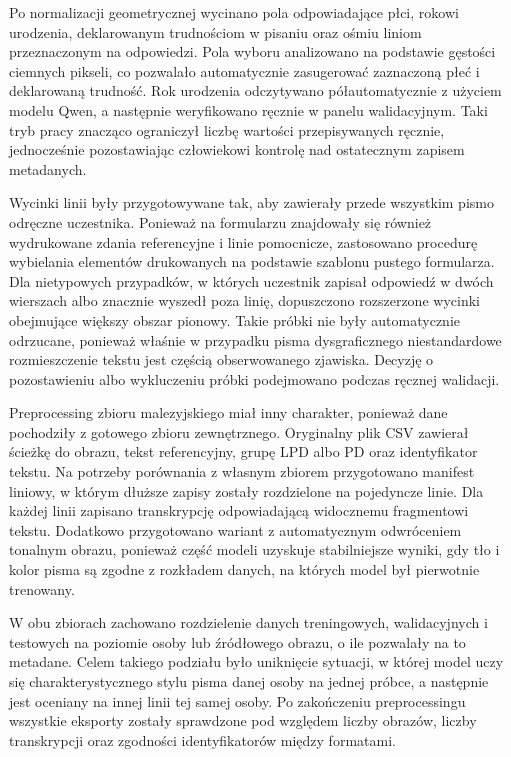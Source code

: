 Po normalizacji geometrycznej wycinano pola odpowiadające płci, rokowi urodzenia, deklarowanym
trudnościom w pisaniu oraz ośmiu liniom przeznaczonym na odpowiedzi. Pola wyboru analizowano
na podstawie gęstości ciemnych pikseli, co pozwalało automatycznie zasugerować zaznaczoną płeć
i deklarowaną trudność. Rok urodzenia odczytywano półautomatycznie z użyciem modelu Qwen,
a następnie weryfikowano ręcznie w panelu walidacyjnym. Taki tryb pracy znacząco ograniczył
liczbę wartości przepisywanych ręcznie, jednocześnie pozostawiając człowiekowi kontrolę nad
ostatecznym zapisem metadanych.

Wycinki linii były przygotowywane tak, aby zawierały przede wszystkim pismo odręczne uczestnika.
Ponieważ na formularzu znajdowały się również wydrukowane zdania referencyjne i linie pomocnicze,
zastosowano procedurę wybielania elementów drukowanych na podstawie szablonu pustego formularza.
Dla nietypowych przypadków, w których uczestnik zapisał odpowiedź w dwóch wierszach albo znacznie
wyszedł poza linię, dopuszczono rozszerzone wycinki obejmujące większy obszar pionowy. Takie
próbki nie były automatycznie odrzucane, ponieważ właśnie w przypadku pisma dysgraficznego
niestandardowe rozmieszczenie tekstu jest częścią obserwowanego zjawiska. Decyzję o pozostawieniu
albo wykluczeniu próbki podejmowano podczas ręcznej walidacji.

Preprocessing zbioru malezyjskiego miał inny charakter, ponieważ dane pochodziły z gotowego
zbioru zewnętrznego. Oryginalny plik CSV zawierał ścieżkę do obrazu, tekst referencyjny, grupę
LPD albo PD oraz identyfikator tekstu. Na potrzeby porównania z własnym zbiorem przygotowano
manifest liniowy, w którym dłuższe zapisy zostały rozdzielone na pojedyncze linie. Dla każdej
linii zapisano transkrypcję odpowiadającą widocznemu fragmentowi tekstu. Dodatkowo przygotowano
wariant z automatycznym odwróceniem tonalnym obrazu, ponieważ część modeli uzyskuje stabilniejsze
wyniki, gdy tło i kolor pisma są zgodne z rozkładem danych, na których model był pierwotnie
trenowany.

W obu zbiorach zachowano rozdzielenie danych treningowych, walidacyjnych i testowych na poziomie
osoby lub źródłowego obrazu, o ile pozwalały na to metadane. Celem takiego podziału było uniknięcie
sytuacji, w której model uczy się charakterystycznego stylu pisma danej osoby na jednej próbce,
a następnie jest oceniany na innej linii tej samej osoby. Po zakończeniu preprocessingu wszystkie
eksporty zostały sprawdzone pod względem liczby obrazów, liczby transkrypcji oraz zgodności
identyfikatorów między formatami.

